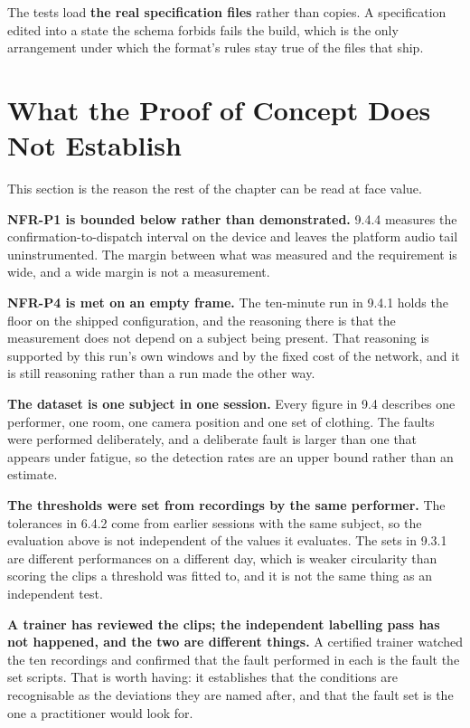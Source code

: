 The tests load \textbf{the real specification files} rather than copies. A specification edited into a state the schema forbids fails the build, which is the only arrangement under which the format's rules stay true of the files that ship.

\section{What the Proof of Concept Does Not Establish}
\label{sec:9.5}

This section is the reason the rest of the chapter can be read at face value.

\textbf{NFR-P1 is bounded below rather than demonstrated.} 9.4.4 measures the confirmation-to-dispatch interval on the device and leaves the platform audio tail uninstrumented. The margin between what was measured and the requirement is wide, and a wide margin is not a measurement.

\textbf{NFR-P4 is met on an empty frame.} The ten-minute run in 9.4.1 holds the floor on the shipped configuration, and the reasoning there is that the measurement does not depend on a subject being present. That reasoning is supported by this run's own windows and by the fixed cost of the network, and it is still reasoning rather than a run made the other way.

\textbf{The dataset is one subject in one session.} Every figure in 9.4 describes one performer, one room, one camera position and one set of clothing. The faults were performed deliberately, and a deliberate fault is larger than one that appears under fatigue, so the detection rates are an upper bound rather than an estimate.

\textbf{The thresholds were set from recordings by the same performer.} The tolerances in 6.4.2 come from earlier sessions with the same subject, so the evaluation above is not independent of the values it evaluates. The sets in 9.3.1 are different performances on a different day, which is weaker circularity than scoring the clips a threshold was fitted to, and it is not the same thing as an independent test.

\textbf{A trainer has reviewed the clips; the independent labelling pass has not happened, and the two are different things.} A certified trainer watched the ten recordings and confirmed that the fault performed in each is the fault the set scripts. That is worth having: it establishes that the conditions are recognisable as the deviations they are named after, and that the fault set is the one a practitioner would look for.

